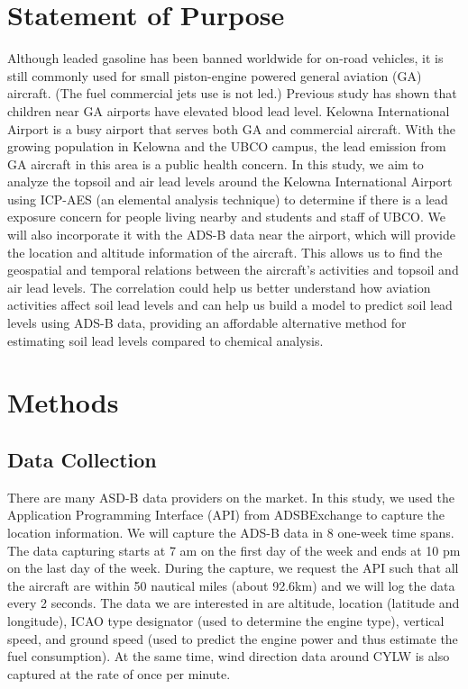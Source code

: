 \documentclass[12pt]{article}
\begin{document}
\section{Statement of Purpose}


Although leaded gasoline has been banned worldwide for on-road vehicles, it is still commonly used for small piston-engine powered general aviation (GA) aircraft. (The fuel commercial jets use is not led.) Previous study has shown that children near GA airports have elevated blood lead level.\cite{miranda_geospatial_2011} \cite{zahran_leaded_2023} \cite{mills_lead_2022} \cite{zahran_effect_2017} Kelowna International Airport is a busy airport that serves both GA and commercial aircraft. With the growing population in Kelowna and the UBCO campus, the lead emission from GA aircraft in this area is a public health concern. In this study, we aim to analyze the topsoil and air lead levels around the Kelowna International Airport using ICP-AES (an elemental analysis technique) to determine if there is a lead exposure concern for people living nearby and students and staff of UBCO. We will also incorporate it with the ADS-B data near the airport, which will provide the location and altitude information of the aircraft. This allows us to find the geospatial and temporal relations between the aircraft's activities and topsoil and air lead levels. The correlation could help us better understand how aviation activities affect soil lead levels and can help us build a model to predict soil lead levels using ADS-B data, providing an affordable alternative method for estimating soil lead levels compared to chemical analysis.
\section{Methods}
\subsection{Data Collection}


There are many ASD-B data providers on the market. In this study, we used the Application Programming Interface (API) from ADSBExchange \cite{adsbexchange} to capture the location information. We will capture the ADS-B data in 8 one-week time spans. The data capturing starts at 7 am on the first day of the week and ends at 10 pm on the last day of the week. During the capture, we request the API such that all the aircraft are within 50 nautical miles (about 92.6km) and we will log the data every 2 seconds. The data we are interested in are altitude, location (latitude and longitude), ICAO type designator (used to determine the engine type), vertical speed, and ground speed (used to predict the engine power and thus estimate the fuel consumption). At the same time, wind direction data around CYLW is also captured at the rate of once per minute. 
\end{document}
